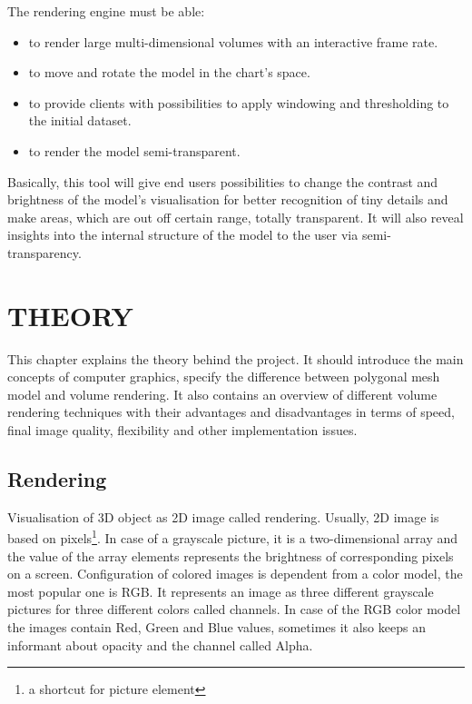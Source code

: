 \documentclass[twoside, english, 11pt]{report}
\begin{document}
The rendering engine must be able:
\begin{itemize} 
\item to render large multi-dimensional volumes with an interactive frame rate.
\item to move and rotate the model in the chart's space.
\item to provide clients with possibilities to apply windowing and thresholding to the initial dataset.
\item to render the model semi-transparent.
\end{itemize}

Basically, this tool will give end users possibilities to change the contrast and brightness of the model's visualisation for better recognition of tiny details and make areas, which are out off certain range, totally transparent. It will also reveal insights into the internal structure of the model to the user via semi-transparency.

\chapter{THEORY}

This chapter explains the theory behind the project. It should introduce the main concepts of computer graphics, specify the difference between polygonal mesh model and volume rendering. It also contains an overview of different volume rendering techniques with their advantages and disadvantages in terms of speed, final image quality, flexibility and other implementation issues.

\section{Rendering}

Visualisation of 3D object as 2D image called rendering. Usually, 2D image is based on pixels\footnote{a shortcut for picture element}. In case of a grayscale picture, it is a two-dimensional array and the value of the array elements represents the brightness of corresponding pixels on a screen. Configuration of colored images is dependent from a color model, the most popular one is RGB. It represents an image as three different grayscale pictures for three different colors called channels. In case of the RGB color model the images contain Red, Green and Blue values, sometimes it also keeps an informant about opacity and the channel called Alpha.\\
\end{document}
